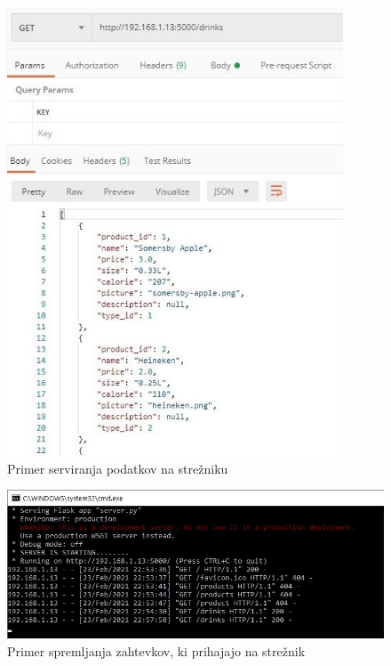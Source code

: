 \documentclass[a4paper, 12pt]{book}
\begin{document}
\begin{figure}[!htb]
\begin{center}
\includegraphics[width=10cm]{Server_example.jpg}
\end{center}
\caption{Primer serviranja podatkov na strežniku}
\label{ServerEX}
\end{figure}

\begin{figure}[!htb]
\begin{center}
\includegraphics[width=12cm]{Server_example_2.jpg}
\end{center}
\caption{Primer spremljanja zahtevkov, ki prihajajo na strežnik}
\label{ServerEX2}
\end{figure}
\end{document}
